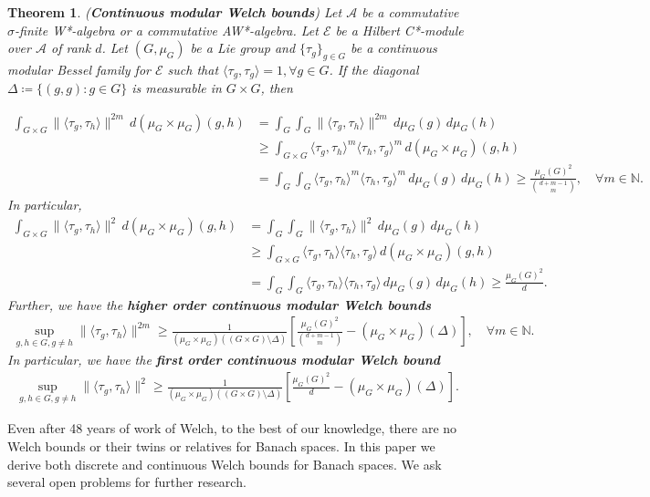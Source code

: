 \documentclass{amsart}
\newtheorem{theorem}{Theorem}[section]
\begin{document}
\begin{theorem}\cite{MAHESHKRISHNA2}
(\textbf{Continuous modular Welch bounds})
Let $\mathcal{A}$ be a commutative $\sigma$-finite W*-algebra or a commutative  AW*-algebra. Let $\mathcal{E}$ be  a Hilbert C*-module over $\mathcal{A}$ of rank $d$. 		Let $(G, \mu_G)$ be a  Lie group  and $\{\tau_g\}_{g\in G}$ be a 	 continuous modular Bessel  family for $\mathcal{E}$ such that $\langle \tau_g, \tau_g \rangle =1, \forall g \in G$. If the diagonal $\Delta\coloneqq \{(g, g):g \in G\}$ is measurable in  $G\times G$, then 

\begin{align*}
	\int_{G\times G}\|\langle \tau_g, \tau_h\rangle\|^{2m}\, d(\mu_G\times\mu_G)(g,h)&=	\int_{G}\int_{G}\|\langle \tau_g, \tau_h\rangle\|^{2m}\, d \mu_G(g)\, d \mu_G(h)\\
	&\geq	\int_{G\times G}\langle \tau_g, \tau_h\rangle^{m}\langle \tau_h, \tau_g\rangle^{m}\, d(\mu_G\times\mu_G)(g,h)\\
	&=	\int_{G}\int_{G}\langle \tau_g, \tau_h\rangle^{m}\langle \tau_h, \tau_g\rangle^{m}\, d \mu_G(g)\, d \mu_G(h)\geq \frac{\mu_G(G)^2}{{d+m-1\choose m}}, \quad \forall m \in \mathbb{N}.
\end{align*}	
In particular, 
\begin{align*}
	\int_{G\times G}\|\langle \tau_g, \tau_h\rangle\|^{2}\, d(\mu_G\times\mu_G)(g,h)&=	\int_{G}\int_{G}\|\langle \tau_g, \tau_h\rangle\|^{2}\, d \mu_G(g)\, d \mu_G(h)\\
	&\geq	\int_{G\times G}\langle \tau_g, \tau_h\rangle\langle \tau_h, \tau_g\rangle\, d(\mu_G\times\mu_G)(g,h)\\
	&=	\int_{G}\int_{G}\langle \tau_g, \tau_h\rangle\langle \tau_h, \tau_g\rangle\, d \mu_G(g)\, d \mu_G(h)\geq \frac{\mu_G(G)^2}{d}.
\end{align*}
Further, we have the \textbf{higher order continuous modular Welch bounds} 
\begin{align*}
	\sup _{g, h \in G, g\neq h}\|\langle \tau_g, \tau_h\rangle \|^{2m}\geq \frac{1}{(\mu_G\times\mu_G)((G\times G)\setminus\Delta)}	\left[\frac{	\mu_G(G)^2}{{d+m-1 \choose m}}-(\mu_G\times\mu_G)(\Delta)\right],  \quad \forall m \in \mathbb{N}.
\end{align*}
In particular, we have the \textbf{first order continuous modular Welch bound} 
\begin{align*}
	\sup _{g, h \in G, g\neq h}\|\langle \tau_g, \tau_h\rangle \|^{2}\geq \frac{1}{(\mu_G\times\mu_G)((G\times G)\setminus\Delta)}\left[\frac{\mu_G(G)^2}{d}-(\mu_G\times\mu_G)(\Delta)\right].
\end{align*}	
\end{theorem}
Even after 48 years of work of Welch, to the best of our knowledge,  there are no Welch bounds or their twins or relatives  for Banach spaces. In this paper we derive both discrete and continuous Welch bounds for Banach spaces. We ask several open problems for further research.
\end{document}
